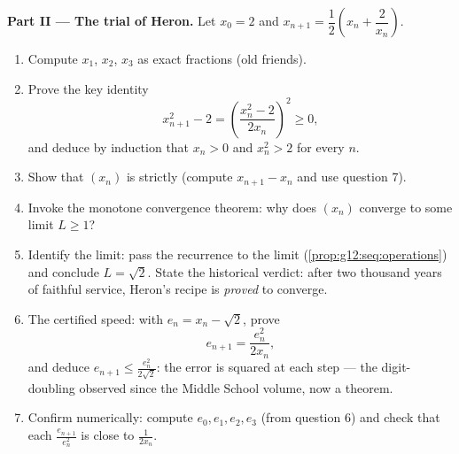 \begin{problem}
\medskip
\noindent\textbf{Part II --- The trial of Heron.}
Let $x_0 = 2$ and $x_{n+1} = \dfrac12\left(x_n +
\dfrac{2}{x_n}\right)$.
\begin{enumerate}[resume]
  \item Compute $x_1$, $x_2$, $x_3$ as exact fractions (old
        friends).
  \item Prove the key identity
        \[
        x_{n+1}^2 - 2 = \left(\frac{x_n^2 - 2}{2x_n}\right)^{\!2}
        \geq 0,
        \]
        and deduce by induction that $x_n > 0$ and
        $x_n^2 > 2$ for every $n$.
  \item Show that $(x_n)$ is strictly  (compute
        $x_{n+1} - x_n$ and use question 7).
  \item Invoke the monotone convergence theorem: why does
        $(x_n)$ converge to some limit $L \geq 1$?
  \item Identify the limit: pass the recurrence to the limit
        (\cref{prop:g12:seq:operations}) and conclude
        $L = \sqrt2$. State the historical verdict: after two
        thousand years of faithful service, Heron's recipe is
        \emph{proved} to converge.
  \item The certified speed: with $e_n = x_n - \sqrt2$, prove
        \[
        e_{n+1} = \frac{e_n^2}{2 x_n} ,
        \]
        and deduce $e_{n+1} \leq \frac{e_n^2}{2\sqrt2}$: the
        error is squared at each step --- the digit-doubling
        observed since the Middle School volume, now a theorem.
  \item Confirm numerically: compute $e_0, e_1, e_2, e_3$ (from
        question 6) and check that each $\frac{e_{n+1}}{e_n^2}$
        is close to $\frac{1}{2x_n}$.
\end{enumerate}


\end{problem}
